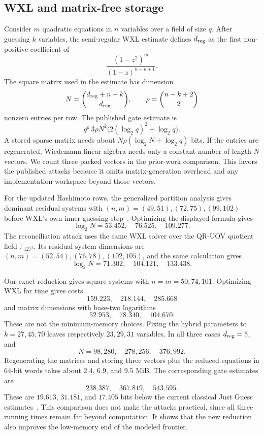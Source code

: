 \documentclass[11pt,a4paper]{article}
\theoremstyle{definition}
\theoremstyle{remark}
\newcommand{\F}{\mathbb F}
\begin{document}
\subsection{WXL and matrix-free storage}

Consider $m$ quadratic equations in $n$ variables over a field of size $q$.
After guessing $k$ variables, the semi-regular WXL estimate defines
$d_{\rm reg}$ as the first non-positive coefficient of
\[
 \frac{(1-z^2)^m}{(1-z)^{n-k+1}}.
\]
The square matrix used in the estimate has dimension
\[
 N=\binom{d_{\rm reg}+n-k}{d_{\rm reg}},
 \qquad
 \rho=\binom{n-k+2}{2}
\]
nonzero entries per row.  The published gate estimate is
\[
 q^k\,3\rho N^2\bigl(2(\log_2q)^2+\log_2q\bigr).
\]
A stored sparse matrix needs about
$N\rho(\log_2N+\log_2q)$ bits.  If the entries are regenerated, Wiedemann
linear algebra needs only a constant number of length-$N$ vectors.  We count
three packed vectors in the prior-work comparison.  This favors the published
attacks because it omits matrix-generation overhead and any implementation
workspace beyond those vectors.

For the updated Hashimoto rows, the generalized partition analysis gives
dominant residual systems with $(n,m)=(49,51),(72,75),(99,102)$ before WXL's
own inner guessing step~\cite{GeneralizedPartition}.  Optimizing the displayed
formula gives
\[
 \log_2N=53.452,\quad76.525,\quad109.277.
\]
The reconciliation attack uses the same WXL solver over the QR-UOV quotient
field $\F_{127^3}$.  Its residual system dimensions are
$(n,m)=(52,54),(76,78),(102,105)$, and the same calculation gives
\[
 \log_2N=71.302,\quad104.121,\quad133.438.
\]

Our exact reduction gives square systems with $n=m=50,74,101$.  Optimizing
WXL for time gives costs
\[
 159.223,\quad218.144,\quad285.668
\]
and matrix dimensions with base-two logarithms
\[
 52.953,\quad78.340,\quad104.670.
\]
These are not the minimum-memory choices.  Fixing the hybrid parameters to
$k=27,45,70$ leaves respectively $23,29,31$ variables.  In all three cases
$d_{\rm reg}=5$, and
\[
 N=98{,}280,\quad278{,}256,\quad376{,}992.
\]
Regenerating the matrices and storing three vectors plus the reduced equations
in 64-bit words takes about $2.4$, $6.9$, and $9.5$ MiB.  The corresponding
gate estimates are
\[
 238.387,\quad367.819,\quad543.595.
\]
These are $19.613$, $31.181$, and $17.405$ bits below the current classical
Just Guess estimates~\cite{JustGuess,GeneralizedPartition}.  This comparison
does not make the attacks practical, since all three running times remain far
beyond computation.  It shows that the new reduction also improves the
low-memory end of the modeled frontier.
\end{document}
